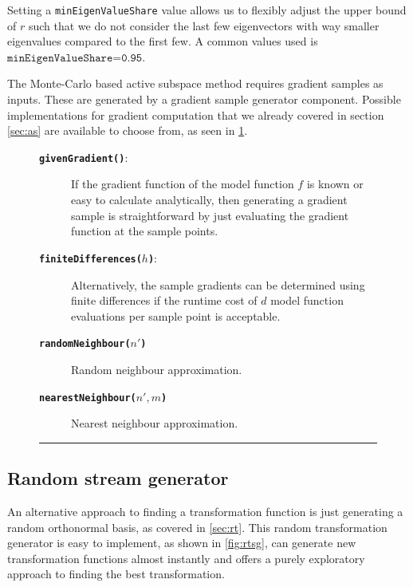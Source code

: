 \documentclass[
  a4paper,  %
  twoside,  %
  bibliography=totoc,
  headsepline,
  cleardoublepage=empty,
  parskip=half,
  draft=false
]{scrbook}
\newcommand{\delimit}{{\color{charcoal}\noindent\rule{\textwidth}{1pt}}}
\begin{document}
Setting a \texttt{minEigenValueShare} value allows us to flexibly adjust the upper bound of $r$ such that we do not consider the last few eigenvectors with way smaller eigenvalues compared to the first few.
A common values used is $\texttt{minEigenValueShare=0.95}$.

The Monte-Carlo based active subspace method requires gradient samples as inputs.
These are generated by a gradient sample generator component.
Possible implementations for gradient computation that we already covered in section \cref{sec:as} are available to choose from, as seen in \cref{fig:gg}.


\newpage

\begin{mdframed}[style=style,frametitle={Gradient sample generator}]
\begin{figure}[H]
\begin{description}
\item[\texttt{\textbf{givenGradient()}}:] If the gradient function of the model function $f$ is known or easy to calculate analytically, then generating a gradient sample is straightforward by just evaluating the gradient function at the sample points.
\item[\texttt{\textbf{finiteDifferences($h$)}}:] Alternatively, the sample gradients can be determined using finite differences if the runtime cost of $d$ model function evaluations per sample point is acceptable.
\item[\texttt{\textbf{randomNeighbour($n'$)}}] Random neighbour approximation.
\item[\texttt{\textbf{nearestNeighbour($n', m$)}}] Nearest neighbour approximation.
\end{description}
\delimit
{}
\label{fig:gg}
\end{figure}
\end{mdframed}

\subsection {Random stream generator}
\label{sec:rtg}

An alternative approach to finding a transformation function is just generating a random orthonormal basis, as covered in \cref{sec:rt}.
This random transformation generator is easy to implement, as shown in \cref{fig:rtsg}, can generate new transformation functions almost instantly and offers a purely exploratory approach to finding the best transformation.
\end{document}
